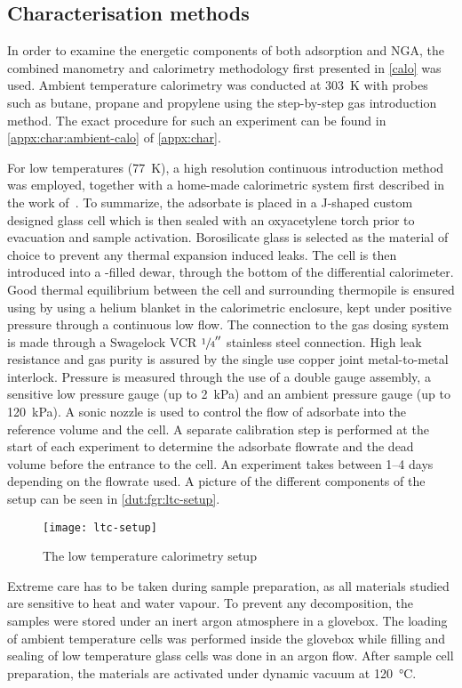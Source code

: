 \subsection{Characterisation methods}

In order to examine the energetic components of both adsorption and 
NGA, the combined manometry and calorimetry methodology first 
presented in \autoref{calo} was used. Ambient temperature calorimetry
was conducted at \SI{303}{\kelvin} with probes such as butane, propane
and propylene using the step-by-step gas introduction method. 
The exact procedure for such an experiment can be found in 
\autoref{appx:char:ambient-calo} of \autoref{appx:char}.

For low temperatures (\SI{77}{\kelvin}), a high resolution continuous
introduction method was employed, together with a home-made 
calorimetric system first described in the work 
of~\citet{rouquerolCalorimetricEvidenceBidimensional1977}. To summarize,
the adsorbate is placed in a J-shaped custom designed glass cell which is
then sealed with an oxyacetylene torch prior to evacuation and sample 
activation. Borosilicate glass is selected as
the material of choice to prevent any thermal expansion induced leaks.
The cell is then introduced into a -filled dewar, through 
the bottom of the differential calorimeter. Good thermal equilibrium
between the cell and surrounding thermopile is ensured using by 
using a helium blanket in the calorimetric enclosure, kept under 
positive pressure through a continuous low flow. The connection to the 
gas dosing system is made through a Swagelock VCR \(\sfrac{1}{4}''\)
stainless steel connection. High leak resistance and gas purity 
is assured by the single use copper joint metal-to-metal interlock.
Pressure is measured through the use of a double gauge assembly,
a sensitive low pressure gauge (up to \SI{2}{\kilo\pascal}) and 
an ambient pressure gauge (up to \SI{120}{\kilo\pascal}).
A sonic nozzle is used to control the flow of adsorbate into the 
reference volume and the cell. A separate calibration step is 
performed at the start of each experiment to determine the adsorbate
flowrate and the dead volume before the entrance to the cell.
An experiment takes between 1--4 days depending 
on the flowrate used. A picture of the different components of the 
setup can be seen in \autoref{dut:fgr:ltc-setup}.

\begin{figure}[htb]
    \centering
    \texttt{[image: ltc-setup]}%
    \caption{The low temperature calorimetry setup}%
    \label{dut:fgr:ltc-setup}
\end{figure}

Extreme care has to be taken during sample preparation, as all materials 
studied are sensitive to heat and water vapour. To prevent any 
decomposition, the samples were stored under an inert argon 
atmosphere in a glovebox. The loading of ambient temperature 
cells was performed inside the glovebox while filling and sealing 
of low temperature glass cells was done in an argon flow. After 
sample cell preparation, the materials are activated under 
dynamic vacuum at \SI{120}{\degreeCelsius}.
